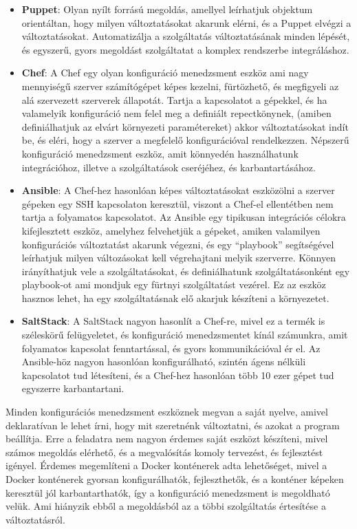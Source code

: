 \documentclass[11pt,magyar,a4paper,twoside,]{report}
\begin{document}
\begin{itemize}
\item
  \textbf{Puppet}\citep{puppet}: Olyan nyílt forrású megoldás, amellyel
  leírhatjuk objektum orientáltan, hogy milyen változtatásokat akarunk
  elérni, és a Puppet elvégzi a változtatásokat. Automatizálja a
  szolgáltatás változtatásának minden lépését, és egyszerű, gyors
  megoldást szolgáltatat a komplex rendszerbe integráláshoz.
\item
  \textbf{Chef}\citep{chef}: A Chef egy olyan konfiguráció menedzsment
  eszköz ami nagy mennyiségű szerver számítógépet képes kezelni,
  fürtözhető, és megfigyeli az alá szervezett szerverek állapotát.
  Tartja a kapcsolatot a gépekkel, és ha valamelyik konfiguráció nem
  felel meg a definiált repectkönynek, (amiben definiálhatjuk az elvárt
  környezeti paramétereket) akkor változtatásokat indít be, és eléri,
  hogy a szerver a megfelelő konfigurációval rendelkezzen. Népszerű
  konfiguráció menedzsment eszköz, amit könnyedén használhatunk
  integrációhoz, illetve a szolgáltatások cseréjéhez, és
  karbantartásához.
\item
  \textbf{Ansible}\citep{ansible}: A Chef-hez hasonlóan képes
  változtatásokat eszközölni a szerver gépeken egy SSH kapcsolaton
  keresztül, viszont a Chef-el ellentétben nem tartja a folyamatos
  kapcsolatot. Az Ansible egy tipikusan integrációs célokra
  kifejlesztett eszköz, amelyhez felvehetjük a gépeket, amiken
  valamilyen konfigurációs változtatást akarunk végezni, és egy
  ``playbook'' segítségével leírhatjuk milyen változásokat kell
  végrehajtani melyik szerverre. Könnyen irányíthatjuk vele a
  szolgáltatásokat, és definiálhatunk szolgáltatásonként egy playbook-ot
  ami mondjuk egy fürtnyi szolgáltatást vezérel. Ez az eszköz hasznos
  lehet, ha egy szolgáltatásnak elő akarjuk készíteni a környezetet.
\item
  \textbf{SaltStack}\citep{saltstack}: A SaltStack nagyon hasonlít a
  Chef-re, mivel ez a termék is széleskörű felügyeletet, és konfiguráció
  menedzsmentet kínál számunkra, amit folyamatos kapcsolat
  fenntartással, és gyors kommunikációval ér el. Az Ansible-höz nagyon
  hasonlóan konfigurálható, szintén ágens nélküli kapcsolatot tud
  létesíteni, és a Chef-hez hasonlóan több 10 ezer gépet tud egyszerre
  karbantartani.
\end{itemize}

Minden konfigurációs menedzsment eszköznek megvan a saját nyelve, amivel
deklaratívan le lehet írni, hogy mit szeretnénk változtatni, és azokat a
program beállítja. Erre a feladatra nem nagyon érdemes saját eszközt
készíteni, mivel számos megoldás elérhető, és a megvalósítás komoly
tervezést, és fejlesztést igényel. Érdemes megemlíteni a Docker
konténerek adta lehetőséget, mivel a Docker konténerek gyorsan
konfigurálhatók, fejleszthetők, és a konténer képeken keresztül jól
karbantarthatók, így a konfiguráció menedzsment is megoldható velük. Ami
hiányzik ebből a megoldásból az a többi szolgáltatás értesítése a
változtatásról.
\end{document}
